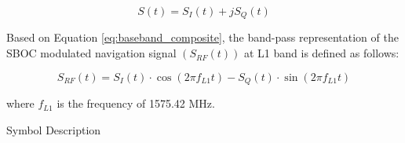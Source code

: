 \begin{equation}
S(t) = S_I(t) + jS_Q(t)
\label{eq:baseband_composite}
\end{equation}

\noindent Based on Equation \ref{eq:baseband_composite}, the band-pass representation of the SBOC modulated navigation signal $(S_{RF}(t))$ at L1 band is defined as follows:

\begin{equation}
S_{RF}(t) = S_I(t) \cdot \cos(2\pi f_{L1} t) - S_Q(t) \cdot \sin(2\pi f_{L1} t)
\label{eq:bandpass_representation}
\end{equation}

\noindent where \(f_{L1}\) is the frequency of 1575.42 MHz.

\begin{table}[h]

\vspace{3mm}
\caption{Symbol Description}
\label{table:symbdesc}
\end{table}

\let\cleardoublepage\clearpage
